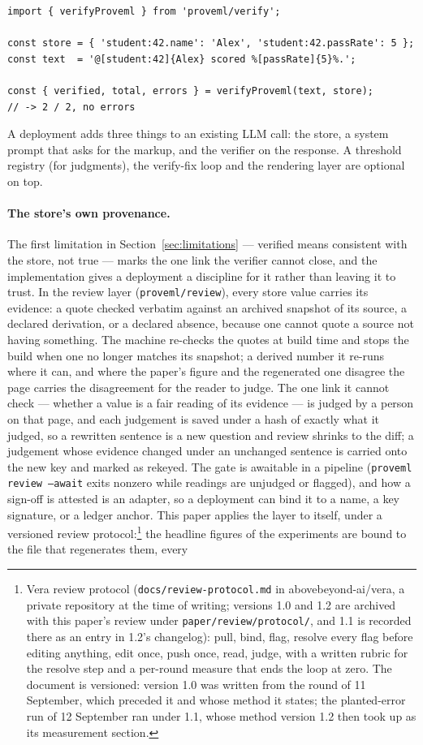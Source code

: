 \documentclass[11pt,a4paper]{article}
\begin{document}
\begin{lstlisting}
import { verifyProveml } from 'proveml/verify';

const store = { 'student:42.name': 'Alex', 'student:42.passRate': 5 };
const text  = '@[student:42]{Alex} scored %[passRate]{5}%.';

const { verified, total, errors } = verifyProveml(text, store);
// -> 2 / 2, no errors
\end{lstlisting}

\noindent A deployment adds three things to an existing LLM call: the store, a system prompt that asks for the markup, and the verifier on the response. A threshold registry (for judgments), the verify-fix loop and the rendering layer are optional on top.

\paragraph{The store's own provenance.} The first limitation in Section~\ref{sec:limitations} --- verified means consistent with the store, not true --- marks the one link the verifier cannot close, and the implementation gives a deployment a discipline for it rather than leaving it to trust. In the review layer (\texttt{proveml/review}), every store value carries its evidence: a quote checked verbatim against an archived snapshot of its source, a declared derivation, or a declared absence, because one cannot quote a source not having something. The machine re-checks the quotes at build time and stops the build when one no longer matches its snapshot; a derived number it re-runs where it can, and where the paper's figure and the regenerated one disagree the page carries the disagreement for the reader to judge. The one link it cannot check --- whether a value is a fair reading of its evidence --- is judged by a person on that page, and each judgement is saved under a hash of exactly what it judged, so a rewritten sentence is a new question and review shrinks to the diff; a judgement whose evidence changed under an unchanged sentence is carried onto the new key and marked as rekeyed. The gate is awaitable in a pipeline (\texttt{proveml review --await} exits nonzero while readings are unjudged or flagged), and how a sign-off is attested is an adapter, so a deployment can bind it to a name, a key signature, or a ledger anchor. This paper applies the layer to itself, under a versioned review protocol:\footnote{Vera review protocol (\texttt{docs/review-protocol.md} in abovebeyond-ai/vera, a private repository at the time of writing; versions 1.0 and 1.2 are archived with this paper's review under \texttt{paper/review/protocol/}, and 1.1 is recorded there as an entry in 1.2's changelog): pull, bind, flag, resolve every flag before editing anything, edit once, push once, read, judge, with a written rubric for the resolve step and a per-round measure that ends the loop at zero. The document is versioned: version 1.0 was written from the round of 11 September, which preceded it and whose method it states; the planted-error run of 12 September ran under 1.1, whose method version 1.2 then took up as its measurement section.} the headline figures of the experiments are bound to the file that regenerates them, every 
\end{document}
